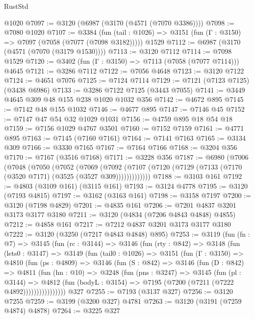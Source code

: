 \begin{lexlean}{RustStd}
\begin{coremodule}
{\begin{coremodule}
{{{{{{{{{{{{{{{{{{{{{{{{{{    @1020
@7097 := @3120 (@6987 (@3170 (@4571 (@7070 @3386))))
@7098 := @7080 @1020
@7107 := @3384
    (fun (tail : @1026) => @3151 (fun (Γ : @3150) => @7097 (@7058 (@7077 (@7098 @3182)))))
    @1529
@7112 := @6987 (@3170 (@4571 (@7070 (@3179 @1530))))
@7113 := @3120 @7112
@7114 := @7098 @1529
@7120 := @3402 (fun (Γ : @3150) => @7113 (@7058 (@7077 @7114))) @4645
@7121 := @3286 @7112
@7122 := @7056 @4648
@7123 := @3120 @7122
@7124 := @4651 @7076
@7125 := @7124 @7114
@7129 := @7121 (@7123 @7125) (@3438 @6986)
@7133 := @3286 @7122 @7125 (@3443 @7055)
@7141 := @3449 @4645 @309 @48 @155 @238 @1020 @1032 @356
@7142 := @4672 @895
@7145 := @7142 @48 @155 @1032
@7146 := @4677 @895
@7147 := @7146 @45
@7152 := @7147 @47 @54 @32 @1029 @1031
@7156 := @4759 @895 @18 @54 @18
@7159 := @7156 @1029 @4767 @3501
@7160 := @7152 @7159
@7161 := @4771 @895
@7163 := @7145 (@7160 @7161)
@7164 := @7141 @7163
@7165 := @3134 @309
@7166 := @3330 @7165
@7167 := @7164 @7166
@7168 := @3204 @356
@7170 := @7167 (@3516 @7168)
@7171 := @3228 @356
@7187 := @6980
    (@7006
      (@7048
        (@7050
          (@7052
            (@7069
              (@7092
                (@7107 (@7120 (@7129 (@7133 (@7170 (@3520 @7171) (@3525 (@3527 @309)))))))))))))
@7188 := @3103 @161
@7192 := @4803 (@3109 @161) (@3115 @161)
@7193 := @3124 @4778
@7195 := @3120 (@7193 @4815)
@7197 := @3162 (@3163 @161)
@7198 := @3158 @7197
@7200 := @3120 (@7198 @4829)
@7201 := @4835 @161
@7206 := @7201 @4837 @3201 @3173 @3177 @3180
@7211 := @3120 (@4834 (@7206 @4843 @4848) @4855)
@7212 := @4858 @161
@7217 := @7212 @4837 @3201 @3173 @3177 @3180
@7222 := @3120 (@3250 (@7217 @4843 @4848) @895)
@7253 := @3119
    (fun (fn : @7) =>
    @3145
      (fun (rc : @3144) =>
      @3146
        (fun (rty : @842) =>
        @3148
          (fun (lets0 : @3147) =>
          @3149
            (fun (tail0 : @1026) =>
            @3151
              (fun (Γ : @3150) =>
              @4810
                (fun (ps : @4809) =>
                @3146
                  (fun (S : @842) =>
                  @3146
                    (fun (D : @842) =>
                    @4811
                      (fun (hn : @10) =>
                      @3248
                        (fun (pns : @3247) =>
                        @3145
                          (fun (pl : @3144) =>
                          @4812
                            (fun (bodyL : @3154) => @7195 (@7200 (@7211 (@7222 @4892))))))))))))))))
    @327
@7255 := @7193 (@3137 @327)
@7256 := @3120 @7255
@7259 := @3199 (@3200 @327) @4781
@7263 := @3120 (@3191 (@7259 @4874) @4878)
@7264 := @3225 @327
}}}}}}}}}}}}}}}}}}}}}}}}}}
\end{coremodule}}
\end{coremodule}
\end{lexlean}
